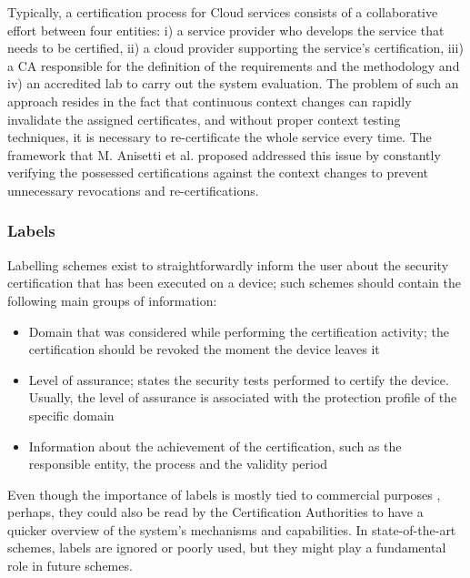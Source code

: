 Typically, a certification process for Cloud services consists of a collaborative effort between four entities: i) a service provider who develops the service that needs to be certified, ii) a cloud provider supporting the service's certification, iii) a CA responsible for the definition of the requirements and the methodology and iv) an accredited lab to carry out the system evaluation. The problem of such an approach resides in the fact that continuous context changes can rapidly invalidate the assigned certificates, and without proper context testing techniques, it is necessary to re-certificate the whole service every time. The framework that M. Anisetti et al. proposed addressed this issue by constantly verifying the possessed certifications against the context changes to prevent unnecessary revocations and re-certifications.


\subsubsection{Labels}
Labelling schemes exist to straightforwardly inform the user about the security certification that has been executed on a device; such schemes should contain the following main groups of information:

\begin{itemize}
    \item Domain that was considered while performing the certification activity; the certification should be revoked the moment the device leaves it

    \item Level of assurance; states the security tests performed to certify the device. Usually, the level of assurance is associated with the protection profile of the specific domain

    \item  Information about the achievement of the certification, such as the responsible entity, the process and the validity period

\end{itemize}

Even though the importance of labels is mostly tied to commercial purposes \cite{baldini2016security}, perhaps, they could also be read by the Certification Authorities to have a quicker overview of the system's mechanisms and capabilities. In state-of-the-art schemes, labels are ignored or poorly used, but they might play a fundamental role in future schemes.



